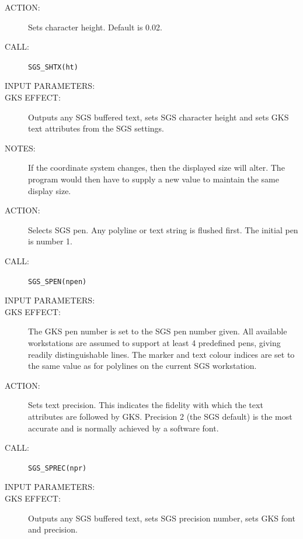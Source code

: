 \documentclass[11pt]{article}
\begin{document}
\begin{description}
\item [ACTION:]
Sets character height.
Default is 0.02.
\item [CALL:]
{\tt SGS\_SHTX(ht)}
\item [INPUT PARAMETERS:]
\begin{params}
\end{params}
\item [GKS EFFECT:]
Outputs any SGS buffered text, sets SGS character height and sets GKS text
attributes from the SGS settings.
\item [NOTES:]
If the coordinate system changes, then the displayed size will alter.
The program would then have to supply a new value to maintain the same display
size.
\end{description}
\goodbreak

\begin{description}
\item [ACTION:]
Selects SGS pen.
Any polyline or text string is flushed first.
The initial pen is number 1.
\item [CALL:]
{\tt SGS\_SPEN(npen)}
\item [INPUT PARAMETERS:]
\begin{params}
\end{params}
\item [GKS EFFECT:]
The GKS pen number is set to the SGS pen number given.
All available workstations are assumed to support at least 4 predefined pens,
giving readily distinguishable lines.
The marker and text colour indices are set to the same value as for polylines on
the current SGS workstation.
\end{description}
\goodbreak

\begin{description}
\item [ACTION:]
Sets text precision.
This indicates the fidelity with which the text attributes are followed by GKS.
Precision 2 (the SGS default) is the most accurate and is normally achieved by
a software font.
\item [CALL:]
{\tt SGS\_SPREC(npr)}
\item [INPUT PARAMETERS:]
\begin{params}
\end{params}
\item [GKS EFFECT:]
Outputs any SGS buffered text, sets SGS precision number, sets GKS font and
precision.
\end{description}
\goodbreak
\end{document}
